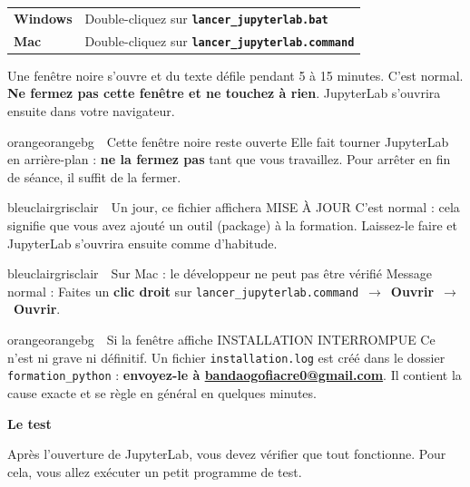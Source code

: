\documentclass[11pt,a4paper]{article}
\makeatletter
\newcommand{\titrepetit}[1]{%
  \par\vspace{10pt}%
  {\large\bfseries\color{bleuclair}#1}%
  \par\vspace{4pt}}
\newenvironment{info}[1]     {\begin{encadre}{bleuclair}{grisclair}{\ding{110}~~#1}}{\end{encadre}}
\newenvironment{attention}[1]{\begin{encadre}{orange}{orangebg}{\ding{110}~~#1}}{\end{encadre}}
\newcommand{\courriel}{bandaogofiacre0@gmail.com}
\newcommand{\adressecontact}{%
  \href{mailto:\courriel}{\textbf{\color{bleuclair}\courriel}}}
\newcommand{\fichier}[1]{\texttt{#1}}
\newcommand{\fleche}{~$\rightarrow$~}
\makeatother
\begin{document}
\vspace{4pt}
\noindent\begin{tcolorbox}[enhanced, sharp corners, colback=grisclair,
  colframe=bordure, boxrule=0.6pt, left=8pt, right=8pt, top=6pt, bottom=6pt,
  before skip=4pt, after skip=8pt]
\begin{tabularx}{\textwidth}{@{}p{2.0cm}X@{}}
\textbf{Windows} & Double-cliquez sur \fichier{\textbf{lancer\_jupyterlab.bat}}\\[5pt]
\textbf{Mac}     & Double-cliquez sur \fichier{\textbf{lancer\_jupyterlab.command}}\\
\end{tabularx}
\end{tcolorbox}

Une fenêtre noire s'ouvre et du texte défile pendant 5 à 15 minutes.
C'est normal. \textbf{Ne fermez pas cette fenêtre et ne touchez à rien}.
JupyterLab s'ouvrira ensuite dans votre navigateur.

\begin{attention}{Cette fenêtre noire reste ouverte}
Elle fait tourner JupyterLab en arrière-plan : \textbf{ne la fermez pas} tant que
vous travaillez. Pour arrêter en fin de séance, il suffit de la fermer.
\end{attention}

\begin{info}{Un jour, ce fichier affichera \og MISE À JOUR\fg{}}
C'est normal : cela signifie que vous avez ajouté un outil (package) à la formation.
Laissez-le faire et JupyterLab s'ouvrira ensuite comme d'habitude.
\end{info}

\begin{info}{Sur Mac : \og le développeur ne peut pas être vérifié\fg{}}
Message normal : Faites un \textbf{clic droit} sur
\fichier{lancer\_jupyterlab.command}\fleche \textbf{Ouvrir}\fleche\textbf{Ouvrir}.
\end{info}

\begin{attention}{Si la fenêtre affiche \og INSTALLATION INTERROMPUE\fg{}}
Ce n'est ni grave ni définitif. Un fichier \fichier{installation.log} est
créé dans le dossier \fichier{formation\_python} :
\textbf{envoyez-le à \adressecontact}. Il contient la cause exacte et se règle en
général en quelques minutes.
\end{attention}

\titrepetit{Le test}
Après l'ouverture de JupyterLab, vous devez vérifier que tout fonctionne.
Pour cela, vous allez exécuter un petit programme de test.
\end{document}
